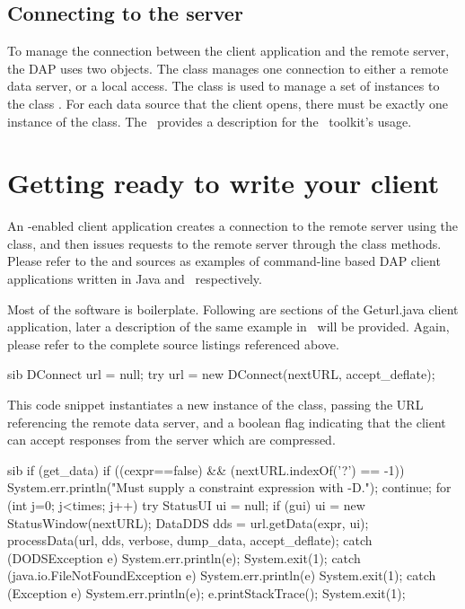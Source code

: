\documentclass{dods-paper}
\begin{document}
\subsection{Connecting to the server}
  
To manage the connection between the client application and the remote
server, the DAP uses two objects.  The  class manages
one connection to either a remote data server, or a local access.  The
 class is used to manage a set of instances to the
class .  For each data source that the client
opens, there must be exactly one instance of the 
class.  The \OPDapi\ provides a description for the \Cpp\ toolkit's
usage.

\section{Getting ready to write your client}
  
An \opendap-enabled client application creates a connection to the
remote server using the  class, and then issues
requests to the remote server through the  class
methods. Please refer to the  and
 sources as examples of command-line
based DAP client applications written in Java and \Cpp\, respectively.

Most of the software is boilerplate. Following are sections of the
Geturl.java client application, later a description of the same
example in \Cpp\ will be provided.  Again, please refer to the complete
source listings referenced above.

\begin{vcode}{sib}
 DConnect url = null;
 try {
    url = new DConnect(nextURL, accept_deflate);
 }
\end{vcode}

This code snippet instantiates a new instance of the 
class, passing the URL referencing the remote data server, and a
boolean flag indicating that the client can accept responses from the
server which are compressed.

\begin{vcode}{sib}
 if (get_data) {
    if ((cexpr==false) && (nextURL.indexOf('?') == -1)) {
        System.err.println("Must supply a constraint expression with -D.");
        continue;
    }
    for (int j=0; j<times; j++) {
        try {
           StatusUI ui = null;
           if (gui)
             ui = new StatusWindow(nextURL);
           DataDDS dds = url.getData(expr, ui);
           processData(url, dds, verbose, dump_data, accept_deflate);
        }
        catch (DODSException e) {
          System.err.println(e);
          System.exit(1);
        }
        catch (java.io.FileNotFoundException e) {
          System.err.println(e)
          System.exit(1);
        }
        catch (Exception e) {
          System.err.println(e);
          e.printStackTrace();
          System.exit(1);
        }
    }
 }
\end{vcode}  
\end{document}
